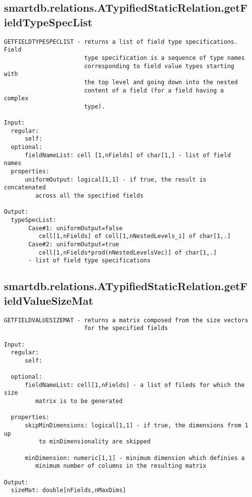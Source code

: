 \subsection{\texorpdfstring{smartdb.relations.ATypifiedStaticRelation.getFieldTypeSpecList}{getFieldTypeSpecList}}\label{method:smartdb.relations.ATypifiedStaticRelation.getFieldTypeSpecList}
\begin{verbatim}
GETFIELDTYPESPECLIST - returns a list of field type specifications. Field
                       type specification is a sequence of type names
                       corresponding to field value types starting with
                       the top level and going down into the nested
                       content of a field (for a field having a complex
                       type).

Input:
  regular:
      self:
  optional:
      fieldNameList: cell [1,nFields] of char[1,] - list of field names
  properties:
      uniformOutput: logical[1,1] - if true, the result is concatenated
         across all the specified fields

Output:
  typeSpecList:
       Case#1: uniformOutput=false
          cell[1,nFields] of cell[1,nNestedLevels_i] of char[1,.]
       Case#2: uniformOutput=true
          cell[1,nFields*prod(nNestedLevelsVec)] of char[1,.]
       - list of field type specifications
\end{verbatim}
\subsection{\texorpdfstring{smartdb.relations.ATypifiedStaticRelation.getFieldValueSizeMat}{getFieldValueSizeMat}}\label{method:smartdb.relations.ATypifiedStaticRelation.getFieldValueSizeMat}
\begin{verbatim}
GETFIELDVALUESIZEMAT - returns a matrix composed from the size vectors
                       for the specified fields

Input:
  regular:
      self:

  optional:
      fieldNameList: cell[1,nFields] - a list of fileds for which the size
         matrix is to be generated

  properties:
      skipMinDimensions: logical[1,1] - if true, the dimensions from 1 up
          to minDimensionality are skipped

      minDimension: numeric[1,1] - minimum dimension which definies a
         minimum number of columns in the resulting matrix

Output:
  sizeMat: double[nFields,nMaxDims]
\end{verbatim}
